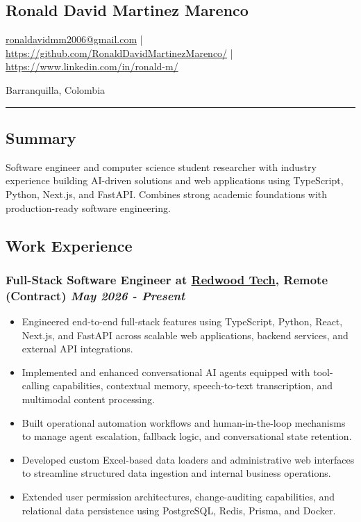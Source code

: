\documentclass[a4paper,10pt]{article}
\begin{document}
\pagestyle{empty}

\begin{center}
  \section*{\LARGE Ronald David Martinez Marenco}
  \href{mailto:ronaldavidmm2006@gmail.com}{ronaldavidmm2006@gmail.com} |
  \href{https://github.com/RonaldDavidMartinezMarenco/}{https://github.com/RonaldDavidMartinezMarenco/} |
  \href{https://www.linkedin.com/in/ronald-m/}{https://www.linkedin.com/in/ronald-m/}

  Barranquilla, Colombia
\end{center}

\hrule
\vspace{4pt}

\subsection*{Summary}
Software engineer and computer science student researcher with industry experience building
AI-driven solutions and web applications using TypeScript, Python, Next.js, and FastAPI. 
Combines strong academic foundations with production-ready software engineering.

\subsection*{Work Experience}

\subsubsection*{%
  \textbf{Full-Stack Software Engineer} at \href{https://www.redwoodtech.co/}{Redwood Tech}, Remote (Contract)
  \hfill
  \textit{May 2026 - Present}
}
\begin{itemize}
  \item Engineered end-to-end full-stack features using TypeScript, Python, React, Next.js, and FastAPI across scalable web applications, backend services, and external API integrations.
  \item Implemented and enhanced conversational AI agents equipped with tool-calling capabilities, contextual memory, speech-to-text transcription, and multimodal content processing.
  \item Built operational automation workflows and human-in-the-loop mechanisms to manage agent escalation, fallback logic, and conversational state retention.
  \item Developed custom Excel-based data loaders and administrative web interfaces to streamline structured data ingestion and internal business operations.
  \item Extended user permission architectures, change-auditing capabilities, and relational data persistence using PostgreSQL, Redis, Prisma, and Docker.
\end{itemize}
\end{document}
